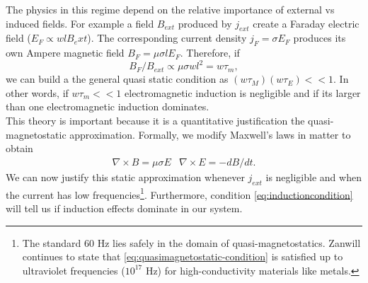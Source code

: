 The physics in this regime depend on the relative importance of external vs induced fields. For example a field $B_{ext}$ produced by $j_{ext}$ create a Faraday electric field ($E_F \propto wl B_ext$). The corresponding current density $j_F = \sigma E_F$ produces its own Ampere magnetic field $B_F = \mu \sigma l E_F$. Therefore, if
\begin{equation}
\label{eq:inductioncondition}
    B_F/B_{ext} \propto \mu \sigma wl^2 = w\tau_m,
\end{equation}
we can build a the general quasi static condition as $(w\tau_M )(w\tau_E )<<1$. In other words, if $w\tau_m<<1$ electromagnetic induction is negligible and if its larger than one electromagnetic induction dominates.
\\
This theory is important because it is a quantitative justification the quasi-magnetostatic approximation. Formally, we modify Maxwell's laws in matter to obtain
\begin{equation}
\label{eq:MaxwellQuasiMagnetostatic}
    \begin{array}{cc}
        \nabla \times B = \mu \sigma E   &  \nabla \times E = - dB/dt.
    \end{array} 
\end{equation}
We can now justify this static approximation whenever $j_{ext}$ is negligible and when the current has low frequencies\footnote{The standard 60 Hz lies safely in the domain of quasi-magnetostatics. Zanwill continues to state that \ref{eq:quasimagnetostatic-condition} is satisfied up to ultraviolet frequencies ($10^17$ Hz) for high-conductivity materials like metals\cite{zangwill2013modern}.}. Furthermore, condition \ref{eq:inductioncondition} will tell us if induction effects dominate in our system.